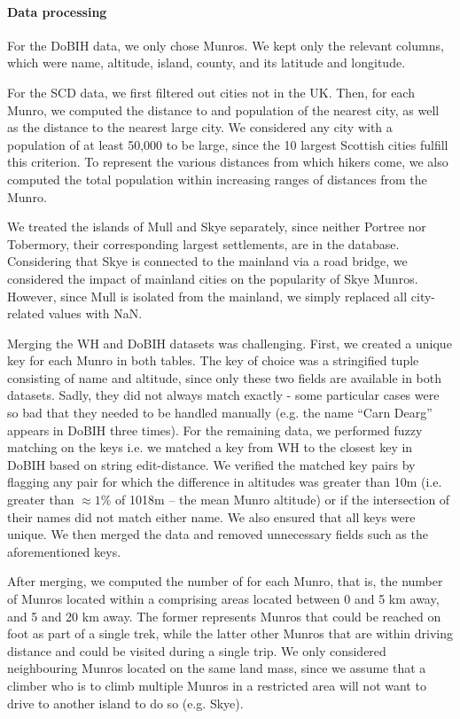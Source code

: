 \documentclass[11pt,a4paper]{article}
\begin{document}
\paragraph{Data processing}
For the DoBIH data, we only chose Munros. We kept only the relevant columns, which were name, altitude, island, county, and its latitude and longitude.

For the SCD data, we first filtered out cities not in the UK. Then, for each Munro, we computed the distance to and population of the nearest city, as well as the distance to the nearest large city. We considered any city with a population of at least 50,000 to be large, since the 10 largest Scottish cities fulfill this criterion. To represent the various distances from which hikers come, we also computed the total population within increasing ranges of distances from the Munro.

We treated the islands of Mull and Skye separately, since neither Portree nor Tobermory, their corresponding largest settlements, are in the database. Considering that Skye is connected to the mainland via a road bridge, we considered the impact of mainland cities on the popularity of Skye Munros. However, since Mull is isolated from the mainland, we simply replaced all city-related values with NaN.

Merging the WH and DoBIH datasets was challenging. First, we created a unique key for each Munro in both tables. The key of choice was a stringified tuple consisting of name and altitude, since only these two fields are available in both datasets. Sadly, they did not always match exactly - some particular cases were so bad that they needed to be handled manually (e.g. the name “Carn Dearg” appears in DoBIH three times). For the remaining data, we performed fuzzy matching on the keys i.e. we matched a key from WH to the closest key in DoBIH based on string edit-distance. We verified the matched key pairs by flagging any pair for which the difference in altitudes was greater than 10m (i.e. greater than $\approx1\%$ of 1018m – the mean Munro altitude) or if the intersection of their names did not match either name. We also ensured that all keys were unique. We then merged the data and removed unnecessary fields such as the aforementioned keys.

After merging, we computed the number of  for each Munro, that is, the number of Munros located within a  comprising areas located between 0 and 5 km away, and 5 and 20 km away. The former represents Munros that could be reached on foot as part of a single trek, while the latter other Munros that are within driving distance and could be visited during a single trip. We only considered neighbouring Munros located on the same land mass, since we assume that a climber who is to climb multiple Munros in a restricted area will not want to drive to another island to do so (e.g. Skye).
\end{document}
